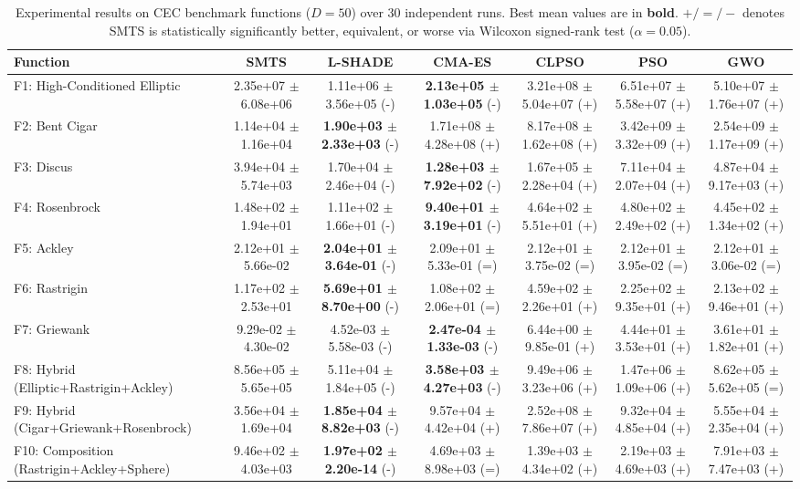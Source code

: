 \begin{table}[t]
\centering
\caption{Experimental results on CEC benchmark functions ($D = 50$) over 30 independent runs. Best mean values are in \textbf{bold}. $+/=/-$ denotes SMTS is statistically significantly better, equivalent, or worse via Wilcoxon signed-rank test ($\alpha = 0.05$).}
\label{tab:results_D50}
\scriptsize
\begin{tabular}{lcccccc}
\hline
Function & \textbf{SMTS} & \textbf{L-SHADE} & \textbf{CMA-ES} & \textbf{CLPSO} & \textbf{PSO} & \textbf{GWO} \\
\hline
F1: High-Conditioned Elliptic & 2.35e+07 $\pm$ 6.08e+06 & 1.11e+06 $\pm$ 3.56e+05 (-) & \textbf{2.13e+05 $\pm$ 1.03e+05} (-) & 3.21e+08 $\pm$ 5.04e+07 (+) & 6.51e+07 $\pm$ 5.58e+07 (+) & 5.10e+07 $\pm$ 1.76e+07 (+) \\
F2: Bent Cigar & 1.14e+04 $\pm$ 1.16e+04 & \textbf{1.90e+03 $\pm$ 2.33e+03} (-) & 1.71e+08 $\pm$ 4.28e+08 (+) & 8.17e+08 $\pm$ 1.62e+08 (+) & 3.42e+09 $\pm$ 3.32e+09 (+) & 2.54e+09 $\pm$ 1.17e+09 (+) \\
F3: Discus & 3.94e+04 $\pm$ 5.74e+03 & 1.70e+04 $\pm$ 2.46e+04 (-) & \textbf{1.28e+03 $\pm$ 7.92e+02} (-) & 1.67e+05 $\pm$ 2.28e+04 (+) & 7.11e+04 $\pm$ 2.07e+04 (+) & 4.87e+04 $\pm$ 9.17e+03 (+) \\
F4: Rosenbrock & 1.48e+02 $\pm$ 1.94e+01 & 1.11e+02 $\pm$ 1.66e+01 (-) & \textbf{9.40e+01 $\pm$ 3.19e+01} (-) & 4.64e+02 $\pm$ 5.51e+01 (+) & 4.80e+02 $\pm$ 2.49e+02 (+) & 4.45e+02 $\pm$ 1.34e+02 (+) \\
F5: Ackley & 2.12e+01 $\pm$ 5.66e-02 & \textbf{2.04e+01 $\pm$ 3.64e-01} (-) & 2.09e+01 $\pm$ 5.33e-01 (=) & 2.12e+01 $\pm$ 3.75e-02 (=) & 2.12e+01 $\pm$ 3.95e-02 (=) & 2.12e+01 $\pm$ 3.06e-02 (=) \\
F6: Rastrigin & 1.17e+02 $\pm$ 2.53e+01 & \textbf{5.69e+01 $\pm$ 8.70e+00} (-) & 1.08e+02 $\pm$ 2.06e+01 (=) & 4.59e+02 $\pm$ 2.26e+01 (+) & 2.25e+02 $\pm$ 9.35e+01 (+) & 2.13e+02 $\pm$ 9.46e+01 (+) \\
F7: Griewank & 9.29e-02 $\pm$ 4.30e-02 & 4.52e-03 $\pm$ 5.58e-03 (-) & \textbf{2.47e-04 $\pm$ 1.33e-03} (-) & 6.44e+00 $\pm$ 9.85e-01 (+) & 4.44e+01 $\pm$ 3.53e+01 (+) & 3.61e+01 $\pm$ 1.82e+01 (+) \\
F8: Hybrid (Elliptic+Rastrigin+Ackley) & 8.56e+05 $\pm$ 5.65e+05 & 5.11e+04 $\pm$ 1.84e+05 (-) & \textbf{3.58e+03 $\pm$ 4.27e+03} (-) & 9.49e+06 $\pm$ 3.23e+06 (+) & 1.47e+06 $\pm$ 1.09e+06 (+) & 8.62e+05 $\pm$ 5.62e+05 (=) \\
F9: Hybrid (Cigar+Griewank+Rosenbrock) & 3.56e+04 $\pm$ 1.69e+04 & \textbf{1.85e+04 $\pm$ 8.82e+03} (-) & 9.57e+04 $\pm$ 4.42e+04 (+) & 2.52e+08 $\pm$ 7.86e+07 (+) & 9.32e+04 $\pm$ 4.85e+04 (+) & 5.55e+04 $\pm$ 2.35e+04 (+) \\
F10: Composition (Rastrigin+Ackley+Sphere) & 9.46e+02 $\pm$ 4.03e+03 & \textbf{1.97e+02 $\pm$ 2.20e-14} (-) & 4.69e+03 $\pm$ 8.98e+03 (=) & 1.39e+03 $\pm$ 4.34e+02 (+) & 2.19e+03 $\pm$ 4.69e+03 (+) & 7.91e+03 $\pm$ 7.47e+03 (+) \\
\hline
\end{tabular}
\end{table}